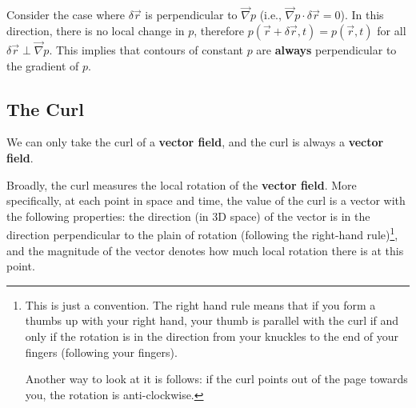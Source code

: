 Consider the case where \(\delta \vec{r}\) is perpendicular to \(\vec{\nabla}p\) (i.e., \(\vec{\nabla}p\cdot \delta \vec{r}=0\)). In this direction, there is no local change in \(p\), therefore \(p(\vec{r}+\delta\vec{r},t)=p(\vec{r},t)\) for all \(\delta\vec{r}\perp \vec{\nabla}p\). This implies that contours of constant \(p\) are \textbf{always} perpendicular to the gradient of \(p\). 

\subsection{The Curl}

We can only take the curl of a \textbf{vector field}, and the curl is always a \textbf{vector field}.

Broadly, the curl measures the local rotation of the \textbf{vector field}. More specifically, at each point in space and time, the value of the curl is a vector with the following properties: the direction (in 3D space) of the vector is in the direction perpendicular to the plain of rotation (following the right-hand rule)\footnote{
    This is just a convention. The right hand rule means that if you form a thumbs up with your right hand, your thumb is parallel with the curl if and only if the rotation is in the direction from your knuckles to the end of your fingers (following your fingers). 
    
    Another way to look at it is follows: if the curl points out of the page towards you, the rotation is anti-clockwise.
}, and the magnitude of the vector denotes how much local rotation there is at this point.

